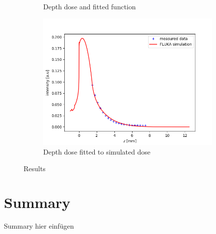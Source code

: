 \documentclass[a4paper,parskip]{scrartcl}
\begin{document}
\begin{figure}
\begin{subfigure}{0.7\linewidth}
\caption{Depth dose and fitted function}
\end{subfigure}
\begin{subfigure}{0.7\linewidth}
\includegraphics[width = \linewidth]{experiment_simulation_fit.png}
\caption{Depth dose fitted to simulated dose}
\end{subfigure}
\caption{Results}
\label{Results}
\end{figure}

\section{Summary}

{\color{red} Summary hier einfügen}   

\newpage


\end{document}
